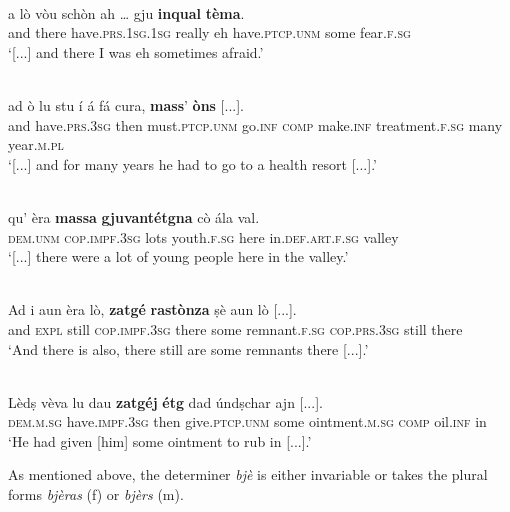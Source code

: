 \ea

\\
\gll  [...] a lò vòu schòn ah … gju \textbf{inqual} \textbf{tèma}.  \\
{} and there have.\textsc{prs.1sg.1sg} really eh {} have.\textsc{ptcp.unm} some fear.\textsc{f.sg} \\
\glt `[...] and there I was eh sometimes afraid.'
\z

\ea

\\
\gll  [...] ad ò lu stu í á fá cura, \textbf{mass}’ \textbf{òns} [...].\\
{} and have.\textsc{prs.3sg} then must.\textsc{ptcp.unm} go.\textsc{inf} \textsc{comp} make.\textsc{inf} treatment.\textsc{f.sg} many year.\textsc{m.pl}\\
\glt `[...] and for many years he had to go to a health resort [...].'
\z

\ea

\\
\gll    [...] qu’ èra \textbf{massa} \textbf{gjuvantétgna} cò ála val. \\
{} \textsc{dem.unm} \textsc{cop.impf.3sg} lots youth.\textsc{f.sg}  here in.\textsc{def.art.f.sg} valley\\
\glt `[...] there were a lot of young people here in the valley.'
\z

\ea

\\
\gll Ad i aun èra lò, \textbf{zatgé} \textbf{rastònza} ṣè aun lò [...].\\
and \textsc{expl} still \textsc{cop.impf.3sg} there some remnant.\textsc{f.sg} \textsc{cop.prs.3sg} still there\\
\glt `And there is also, there still are some remnants there [...].'
\z

\ea
{}\\
\gll  Lèdṣ vèva lu dau \textbf{zatgéj} \textbf{étg} dad úndṣchar ajn [...].\\
\textsc{dem.m.sg} have.\textsc{impf.3sg} then  give.\textsc{ptcp.unm} some ointment.\textsc{m.sg} \textsc{comp} oil.\textsc{inf} in\\
\glt `He had given [him] some ointment to rub in [...].'
\z

As mentioned above, the determiner \textit{bjè} is either invariable or takes the plural forms \textit{bjèras} (f) or \textit{bjèrs} (m).

